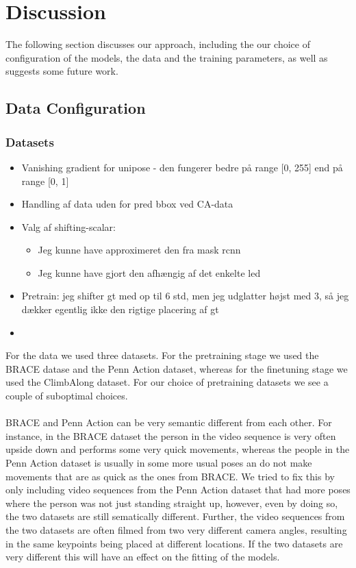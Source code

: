\documentclass[./main.tex]{subfiles}
\begin{document}
\section{Discussion}
The following section discusses our approach, including the our choice of configuration of the models, the data and the training parameters, as well as suggests some future work.

\subsection{Data Configuration}
\subsubsection{Datasets}
\begin{itemize}
    \item Vanishing gradient for unipose - den fungerer bedre på range [0, 255] end på range [0, 1]
    \item Handling af data uden for pred bbox ved CA-data
    \item Valg af shifting-scalar:
    \begin{itemize}
        \item Jeg kunne have approximeret den fra mask rcnn
        \item Jeg kunne have gjort den afhængig af det enkelte led
    \end{itemize}
    \item Pretrain: jeg shifter gt med op til 6 std, men jeg udglatter højst med 3, så jeg dækker egentlig ikke den rigtige placering af gt
    \item 
\end{itemize}
For the data we used three datasets. For the pretraining stage we used the BRACE datase and the Penn Action dataset, whereas for the finetuning stage we used the ClimbAlong dataset. For our choice of pretraining datasets we see a couple of suboptimal choices. 
\\
\\
BRACE and Penn Action can be very semantic different from each other. For instance, in the BRACE dataset the person in the video sequence is very often upside down and performs some very quick movements, whereas the people in the Penn Action dataset is usually in some more usual poses an do not make movements that are as quick as the ones from BRACE. We tried to fix this by only including video sequences from the Penn Action dataset that had more poses where the person was not just standing straight up, however, even by doing so, the two datasets are still sematically different. Further, the video sequences from the two datasets are often filmed from two very different camera angles, resulting in the same keypoints being placed at different locations. If the two datasets are very different this will have an effect on the fitting of the models.
\end{document}
